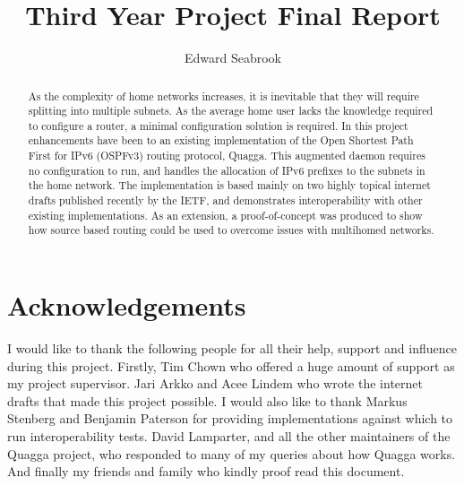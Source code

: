 \documentclass[12pt,a4paper,twoside]{report}
\author{Edward Seabrook}
\title{Third Year Project Final Report}
\begin{document}


\begin{abstract}
As the complexity of home networks increases, it is inevitable that they will
require splitting into multiple subnets. As the average home user lacks the
knowledge required to configure a router, a minimal configuration solution is
required. In this project enhancements have been to an existing implementation
of the Open Shortest Path First for IPv6 (OSPFv3) routing protocol, Quagga.
This augmented daemon requires no configuration to run, and handles the
allocation of IPv6 prefixes to the subnets in the home network. The
implementation is based mainly on two highly topical internet drafts published
recently by the IETF\@{}, and
demonstrates interoperability with other existing implementations. As an
extension, a proof-of-concept was produced to show how source based routing
could be used to overcome issues with multihomed networks. 
\end{abstract}

\tableofcontents
\clearpage

\chapter*{Acknowledgements}
I would like to thank the following people for all their help, support and
influence during this project. Firstly, Tim Chown who offered a huge amount of
support as my project supervisor. Jari Arkko and Acee Lindem who wrote the
internet drafts that made this project possible. I would also like to thank
Markus Stenberg and Benjamin Paterson for providing implementations against
which to run interoperability tests. David Lamparter, and all the other
maintainers of the Quagga project, who responded to many of my queries about
how Quagga works. And finally my friends and family who kindly proof read this
document.



\printnomenclature
{}
\raggedbottom
\pagebreak

{}
{}



\end{document}
